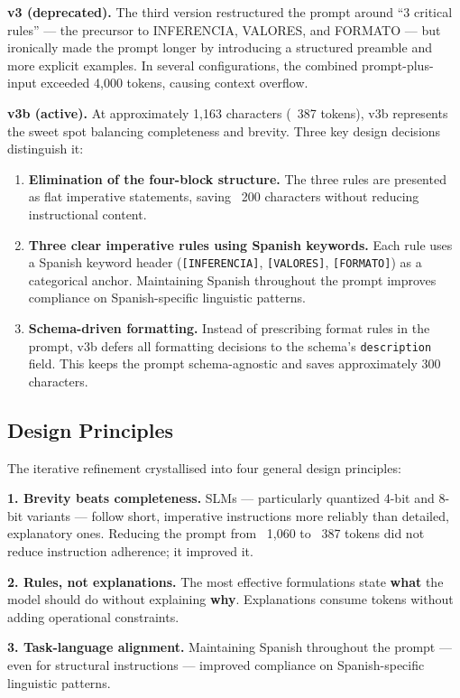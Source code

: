 \documentclass[onecolumn]{ceurart}
\begin{document}
\textbf{v3 (deprecated).} The third version restructured the prompt around
``3 critical rules'' --- the precursor to INFERENCIA, VALORES, and FORMATO ---
but ironically made the prompt longer by introducing a structured preamble and
more explicit examples. In several configurations, the combined
prompt-plus-input exceeded 4,000 tokens, causing context overflow.

\textbf{v3b (active).} At approximately 1,163 characters (~387 tokens), v3b
represents the sweet spot balancing completeness and brevity. Three key design
decisions distinguish it:

\begin{enumerate}
  \item \textbf{Elimination of the four-block structure.} The three rules are
  presented as flat imperative statements, saving ~200 characters without
  reducing instructional content.
  \item \textbf{Three clear imperative rules using Spanish keywords.} Each rule
  uses a Spanish keyword header (\texttt{[INFERENCIA]}, \texttt{[VALORES]},
  \texttt{[FORMATO]}) as a categorical anchor. Maintaining Spanish throughout
  the prompt improves compliance on Spanish-specific linguistic patterns.
  \item \textbf{Schema-driven formatting.} Instead of prescribing format rules
  in the prompt, v3b defers all formatting decisions to the schema's
  \texttt{description} field. This keeps the prompt schema-agnostic and saves
  approximately 300 characters.
\end{enumerate}

\subsection{Design Principles}

The iterative refinement crystallised into four general design principles:

\textbf{1. Brevity beats completeness.} SLMs --- particularly quantized 4-bit
and 8-bit variants --- follow short, imperative instructions more reliably than
detailed, explanatory ones. Reducing the prompt from ~1,060 to ~387 tokens did
not reduce instruction adherence; it improved it.

\textbf{2. Rules, not explanations.} The most effective formulations state
\textbf{what} the model should do without explaining \textbf{why}. Explanations
consume tokens without adding operational constraints.

\textbf{3. Task-language alignment.} Maintaining Spanish throughout the
prompt --- even for structural instructions --- improved compliance on
Spanish-specific linguistic patterns.
\end{document}
